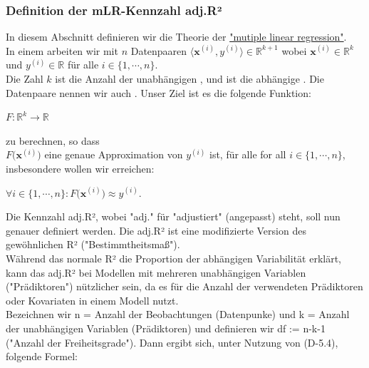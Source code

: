 \documentclass[12pt]{article}
\begin{document}
\subsubsection{Definition der mLR-Kennzahl adj.R²}
%
In diesem Abschnitt definieren wir die Theorie der \href{https://en.wikipedia.org/wiki/Linear_regression}{"mutiple linear regression"}.\\
In einem {\color{blue}{multiplen Regression Problem}} arbeiten wir mit $n$ Datenpaaren $\langle\mathbf{x}^{(i)}, y^{(i)} \rangle \in \mathbb{R}^{k+1} $ 
wobei $\mathbf{x}^{(i)} \in \mathbb{R}^k$ und $y^{(i)} \in \mathbb{R}$ für alle $i \in \{1,\cdots,n\}$.  \\
Die Zahl $k$ ist die Anzahl der unabhängigen { }, und {} ist die abhängige {\color{blue}{Zielvariable ("target column")}}. Die Datenpaare nennen wir auch {\color{blue}{Trainings-Menge}}. Unser Ziel ist es die folgende Funktion:  
\\[0.2cm]
\hspace*{1.3cm}
\begin{large}
$F:\mathbb{R}^k \rightarrow \mathbb{R}$ 
\end{large} 
zu berechnen, so dass 
\\[0.2cm]  
$ F\bigl(\mathbf{x}^{(i)}\bigr)$ eine  genaue Approximation von $y^{(i)}$ ist,  für alle for all $i\in\{1,\cdots,n\}$, insbesondere wollen wir erreichen: \\[0.3cm]
\hspace*{1.3cm}
\begin{large}
$\forall i\in\{1,\cdots,n\}:F\bigl(\mathbf{x}^{(i)}\bigr) \approx y^{(i)}$. \\[0.4cm]
\end{large}
%
Die Kennzahl adj.R², wobei "adj." für "adjustiert" (angepasst) steht, soll nun genauer definiert werden. Die adj.R² ist eine modifizierte Version des gewöhnlichen R² ("Bestimmtheitsmaß").\\
Während das normale R² die Proportion der abhängigen Variabilität erklärt, kann das adj.R² bei Modellen mit mehreren unabhängigen Variablen ("Prädiktoren") nützlicher sein, da es für die Anzahl der verwendeten Prädiktoren oder Kovariaten in einem Modell nutzt.\\
Bezeichnen wir n = Anzahl der Beobachtungen (Datenpunke) und k = Anzahl der unabhängigen Variablen (Prädiktoren) und definieren wir df := n-k-1 ("Anzahl der Freiheitsgrade"). Dann ergibt sich, unter Nutzung von (D-5.4), folgende Formel:\\[0.1cm]
\end{document}
